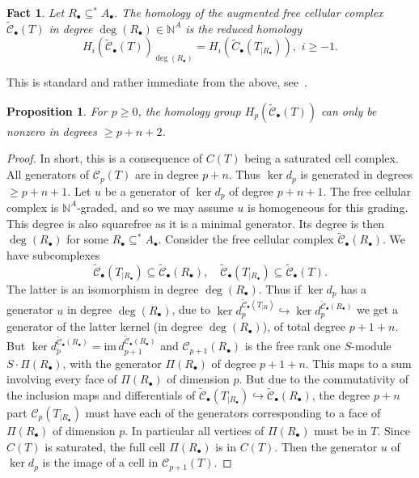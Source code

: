 \documentclass[10pt,a4paper]{article}
\newtheorem{prop}[cdrthm]{Proposition}
\theoremstyle{definition}
\theoremstyle{remark}
\newcommand{\Cgeo}{C}
\newcommand{\susst}{\subseteq^*}
\newcommand{\Ctbu}{\tilde{C}_{\bullet}}
\newcommand{\Ctalg}{\tilde{{\mathcal C}}_{\bullet}}
\newcommand{\Cal}{{\mathcal C}}
\theoremstyle{plain}
\newtheorem{fact}{Fact}
\newcommand{\im}{\text{im}\,}
\newcommand{\sus}{\subseteq}
\newcommand{\NN}{{\mathbb N}}
\newcommand{\Ab}{A_\bullet}
\newcommand{\Rb}{R_\bullet}
\begin{document}
\begin{fact} \label{fact:cell-hom} Let $\Rb \sus^* \Ab$. 
  The homology of the augmented free cellular complex $\Ctalg(T)$
  in degree $\deg(\Rb) \in \NN^A$ is the reduced homology
  \[ H_i({\Ctalg}(T))_{\deg(\Rb)} = {H}_i(\Ctbu(T_{|\Rb})),
    \, \, i \geq -1.\]
\end{fact}

This is standard and rather immediate from the above,
see~\cite[Section 4]{MiSt}.

\setcounter{cdrthm}{3}

\begin{prop} \label{pro:cellcx-homology}
  For $p \geq 0$, the homology group $ H_p({\Ctalg}(T))$
 can only be nonzero in degrees $\geq p+n+2$.
\end{prop}

\begin{proof}
  In short, this is a consequence of $C(T)$ being a saturated cell complex.
 All generators of $\Cal_p(T)$ are in degree $p+n$.
  Thus $\ker d_{p}$ is generated in degrees $\geq p+n+1$.
Let $u$ be a generator of $\ker d_p$ of degree $p+n+1$.
The free cellular complex is $\NN^A$-graded, and so we may assume $u$ is
  homogeneous for this grading.
  This degree  is also squarefree
  as it is a minimal generator. Its degree is then  $\deg(\Rb)$
  for some $\Rb \susst \Ab$.
  Consider the free cellular complex $\Ctalg(\Rb)$. We have subcomplexes
  \[ \Ctalg(T_{|\Rb}) \sus \Ctalg(\Rb), \quad \Ctalg(T_{|\Rb}) \sus \Ctalg(T).\]
The latter is an isomorphism in degree $\deg(\Rb)$. 
  Thus if $\ker d_{p}$ has a generator $u$ in degree $\deg(\Rb)$, due to
  $\ker d_p^{\Ctalg(T_{|R})} \hookrightarrow \ker d_p^{\Ctalg(\Rb)}$ we get
  a generator of the latter kernel (in degree $\deg(\Rb)$),
  of total degree $p+1+n$.
  But $\ker d_p^{\Ctalg(\Rb)} = \im d_{p+1}^{\Ctalg(\Rb)}$
and $\Cal_{p+1}(\Rb)$ is the free rank one $S$-module
  $S \! \overset{}{\cdot} \! {\Pi(\Rb)}$,  with the generator $\Pi(\Rb)$ of degree $p+1+n$.
  This maps to a sum involving every face of $\Pi(\Rb)$ of dimension
  $p$. But due to the commutativity of the inclusion maps and differentials
  of 
$\Ctalg(T_{|\Rb}) \hookrightarrow \Ctalg(\Rb)$, 
 the degree $p+n$ part $\Cal_p(T_{|\Rb})$ must have
 each of the generators corresponding to a face of $\Pi(\Rb)$
 of dimension $p$. 
  In particular all vertices of $\Pi(\Rb)$ must be in $T$.  Since
  $\Cgeo(T)$ is saturated, 
  the full cell $\Pi(\Rb)$ is in $\Cgeo(T)$.
  Then the generator 
  $u$ of $\ker d_p$ is the image of a cell in $\Cal_{p+1}(T)$. 
\end{proof}
\end{document}
